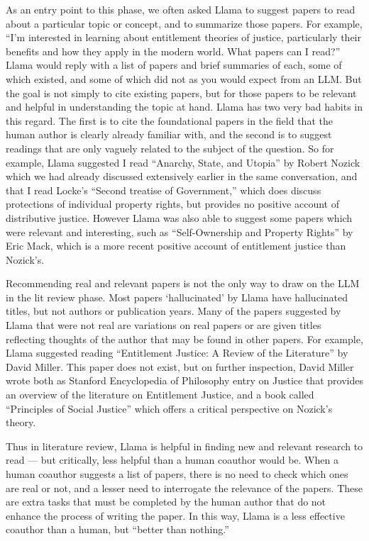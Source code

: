 As an entry point to this phase, we often asked Llama to suggest papers to read
about a particular topic or concept, and to summarize those papers. For example,
``I'm interested in learning about entitlement theories of justice, particularly
their benefits and how they apply in the modern world. What papers can I read?''
Llama would reply with a list of papers and brief summaries of each, some of
which existed, and some of which did not as you would expect from an LLM. But 
the goal is not simply to cite existing papers, but for those papers to be
relevant and helpful in understanding the topic at hand. Llama has two very bad
habits in this regard. The first is to cite the foundational papers in the field
that the human author is clearly already familiar with, and the second is to 
suggest readings that are only vaguely related to the subject of the question.
So for example, Llama suggested I read ``Anarchy, State, and Utopia'' by Robert
Nozick which we had already discussed extensively earlier in the same
conversation, and that I read Locke's ``Second treatise of Government,'' which 
does discuss protections of individual property rights, but provides no positive
account of distributive justice. However Llama was also able to suggest some
papers which were relevant and interesting, such as ``Self-Ownership and
Property Rights'' by Eric Mack, which is a more recent positive account of
entitlement justice than Nozick's. 

Recommending real and relevant papers is not the only way to draw on the LLM in
the lit review phase. Most papers `hallucinated' by Llama have hallucinated 
titles, but not authors or publication years. Many of the papers suggested by
Llama that were not real are variations on real papers or are given titles
reflecting thoughts of the author that may be found in other papers. For example,
Llama suggested reading ``Entitlement Justice: A Review of the Literature'' by 
David Miller. This paper does not exist, but on further inspection, David Miller
wrote both as Stanford Encyclopedia of Philosophy entry on Justice that provides
an overview of the literature on Entitlement Justice, and a book called
``Principles of Social Justice'' which offers a critical perspective on Nozick's
theory.

Thus in literature review, Llama is helpful in finding new and relevant research
to read — but critically, less helpful than a human coauthor would be. When a
human coauthor suggests a list of papers, there is no need to check which ones
are real or not, and a lesser need to interrogate the relevance of the papers.
These are extra tasks that must be completed by the human author that do not
enhance the process of writing the paper. In this way, Llama is a less effective
coauthor than a human, but ``better than nothing.''

